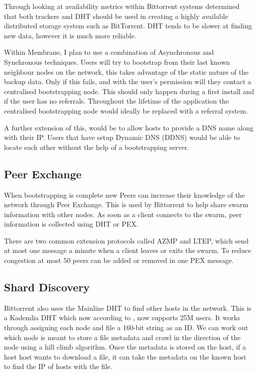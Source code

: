 \documentclass[11pt, a4paper, twocolumn, twoside]{report}
\begin{document}
Through looking at availability metrics within Bittorrent systems \cite{neglia2007availability} determined that both trackers and DHT should be used in creating a highly available distributed storage system such as BitTorrent. DHT tends to be slower at finding new data, however it is much more reliable.

Within Membrane, I plan to use a combination of Asynchronous and Synchronous techniques. Users will try to bootstrap from their last known neighbour nodes on the network, this takes advantage of the static nature of the backup data. Only if this fails, and with the user's permission will they contact a centralised bootstrapping node. This should only happen during a first install and if the user has no referrals. Throughout the lifetime of the application the centralised bootstrapping node would ideally be replaced with a referral system.

A further extension of this, would be to allow hosts to provide a DNS name along with their IP. Users that have setup Dynamic DNS (DDNS) \citep{bound1997dynamic} would be able to locate each other without the help of a bootstrapping server.

\subsection{Peer Exchange} \label{sec:pex}

When bootstrapping is complete new Peers can increase their knowledge of the network through Peer Exchange. This is used by Bittorrent to help share swarm information with other nodes. As soon as a client connects to the swarm, peer information is collected using DHT or PEX.

There are two common extension protocols called AZMP and LTEP, which send at most one message a minute when a client leaves or exits the swarm. To reduce congestion at most 50 peers can be added or removed in one PEX message. \citep{vuze2010vuze}

\subsection{Shard Discovery}

Bittorrent also uses the Mainline DHT to find other hosts in the network. This is a Kademlia DHT which now according to \cite{jones2015mainlinedht}, now supports 25M users. It works through assigning each node and file a 160-bit string as an ID. We can work out which node is meant to store a file metadata and crawl in the direction of the node using a hill climb algorithm. Once the metadata is stored on the host, if a host host wants to download a file, it can take the metadata on the known host to find the IP of hosts with the file.
\end{document}
